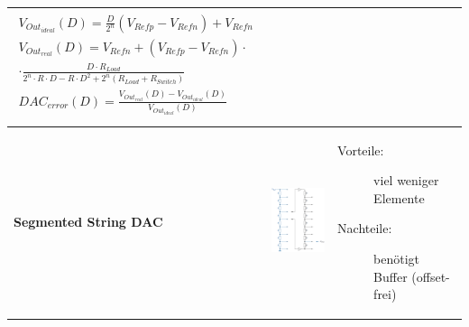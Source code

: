 \begin{tabular}{|>{\bfseries}p{3cm}|c|p{6.6cm}|}
	  {\begin{align*}
	  	V_{Out_{ideal}}(D) = \frac{D}{2^n}(V_{Refp}-V_{Refn})+V_{Refn}\\
	  	V_{Out_{real}}(D) = V_{Refn}+\left(V_{Refp}-V_{Refn}\right)\cdot\\
	  		\cdot\frac{D \cdot R_{Load}}{2^n \cdot R \cdot D-R \cdot D^2 + 2^n (R_{Load} + R_{Switch}) }\\
	  	DAC_{error}(D)=\frac{V_{Out_{real}}(D)-V_{Out_{ideal}}(D)}{V_{Out_{ideal}}(D)}\\
	  \end{align*}}
	  
	\\ \hline
	Segmented String DAC \hartl{459}
	& \includegraphics[width=5cm, height = 5cm, valign=t]{pictures/segmented_string_DAC}
	& \begin{description}
  		\item[Vorteile: ] viel weniger Elemente
  		\item[Nachteile:] benötigt Buffer (offset-frei)
	  \end{description}
	\\ \hline
\end{tabular}
\renewcommand{\arraystretch}{\arraystretchOriginal}


